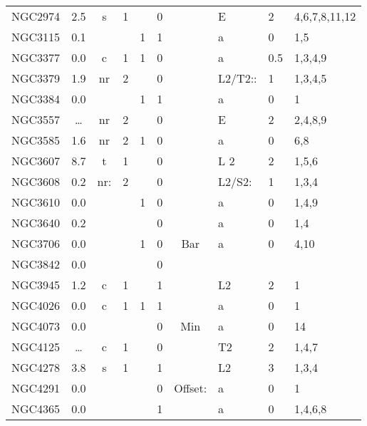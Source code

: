 \begin{tabular}{lcccccclll}
NGC2974     & 2.5 &  s  & 1  &               & 0 &          & E & 2  & 4,6,7,8,11,12   \\
NGC3115     & 0.1 &     &    &  1      & 1           &          & a & 0  & 1,5            \\
NGC3377     & 0.0 &  c  & 1  &  1      & 0 &          & a & 0.5 & 1,3,4,9        \\
NGC3379     & 1.9 & nr  & 2  &               & 0 &          & L2/T2::& 1  & 1,3,4,5           \\
NGC3384     & 0.0 &     &    &  1      & 1           &          & a & 0  & 1             \\
NGC3557     & \dots &nr & 2  &               & 0 &          & E & 2  & 2,4,8,9      \\
NGC3585     & 1.6 & nr  & 2  &  1      & 0 &          & a & 0  & 6,8           \\
NGC3607     & 8.7 & t   & 1  &               & 0 &          & L 2     & 2  & 1,5,6         \\
NGC3608     & 0.2 & nr: & 2  &               & 0 &          & L2/S2: & 1  & 1,3,4             \\
NGC3610     & 0.0 &     &    &  1      & 0 &          & a & 0  & 1,4,9           \\
NGC3640     & 0.2 &     &    &               & 0 &          & a & 0  & 1,4           \\
NGC3706     & 0.0 &     &    &  1      & 0 & Bar      & a & 0  & 4,10             \\
NGC3842     & 0.0 &     &    &               & 0 &          & &    &               \\
NGC3945     & 1.2 & c   & 1  &               & 1           &          & L2     & 2  & 1             \\
NGC4026     & 0.0 & c   & 1  &  1      & 1           &          & a & 0  & 1             \\
NGC4073     & 0.0 &     &    &               & 0 & Min      & a & 0  & 14            \\
NGC4125     & \dots & c & 1  &               & 0 &          & T2     & 2  & 1,4,7         \\
NGC4278     & 3.8 & s   & 1  &               & 1           &          & L2     & 3  & 1,3,4        \\
NGC4291     & 0.0 &     &    &               & 0 & Offset:  & a & 0  & 1             \\
NGC4365     & 0.0 &     &    &               & 1           &          & a & 0  & 1,4,6,8        \\

\end{tabular}
